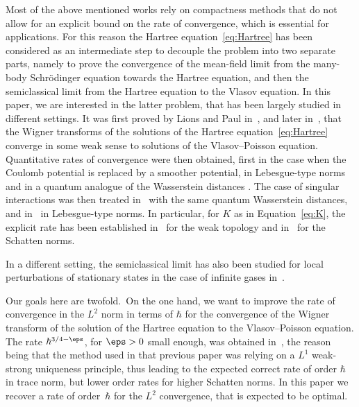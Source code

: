 Most of the above mentioned works rely on compactness methods that do not allow for an explicit bound on the rate of convergence, which is essential for applications. For this reason the Hartree equation~\eqref{eq:Hartree} has been considered as an intermediate step to decouple the problem into two separate parts, namely to prove the convergence of the mean-field limit from the many-body Schrödinger equation towards the Hartree equation, and then the semiclassical limit from the Hartree equation to the Vlasov equation. In this paper, we are interested in the latter problem, that has been largely studied in different settings. It was first proved by Lions and Paul in~\cite{lions_sur_1993}, and later in~\cite{markowich_classical_1993,figalli_semiclassical_2012}, that the Wigner transforms of the solutions of the Hartree equation~\eqref{eq:Hartree} converge in some weak sense to solutions of the Vlasov--Poisson equation. Quantitative rates of convergence were then obtained, first in the case when the Coulomb potential is replaced by a smoother potential, in Lebesgue-type norms~\cite{athanassoulis_strong_2011, amour_semiclassical_2013, benedikter_hartree_2016} and in a quantum analogue of the Wasserstein distances \cite{golse_schrodinger_2017}. The case of singular interactions was then treated in~\cite{lafleche_propagation_2019, lafleche_global_2021} with the same quantum Wasserstein distances, and in~\cite{saffirio_semiclassical_2019, saffirio_hartree_2020, lafleche_strong_2021} in Lebesgue-type norms. In particular, for $K$ as in Equation~\eqref{eq:K}, the explicit rate has been established in~\cite{lafleche_propagation_2019} for the weak topology and in~\cite{saffirio_hartree_2020, lafleche_strong_2021} for the Schatten norms.

In a different setting, the semiclassical limit has also been studied for local perturbations of stationary states in the case of infinite gases in~\cite{lewin_hartree_2020}.

Our goals here are twofold.~On the one hand, we want to improve the rate of convergence in the $L^2$ norm in terms of $\hbar$ for the convergence of the Wigner transform of the solution of the Hartree equation to the Vlasov--Poisson equation. The rate $\hbar^{3/4-\eps}$, for $\eps>0$ small enough, was obtained in~\cite{lafleche_strong_2021}, the reason being that the method used in that previous paper was relying on a $L^1$ weak-strong uniqueness principle, thus leading to the expected correct rate of order $\hbar$ in trace norm, but lower order rates for higher Schatten norms. In this paper we recover a rate of order~$\hbar$ for the $L^2$ convergence, that is expected to be optimal.

